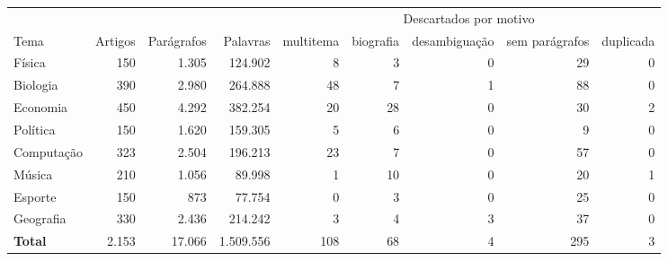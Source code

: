 \footnotesize
\begin{tabular}{lrrrrrrrr}
\toprule
 &  &  &  & \multicolumn{5}{c}{Descartados por motivo} \\
\cmidrule(l){5-9}
Tema & Artigos & Parágrafos & Palavras & multitema & biografia & desambiguação & sem parágrafos & duplicada \\
\midrule
Física & 150 & 1.305 & 124.902 & 8 & 3 & 0 & 29 & 0 \\
Biologia & 390 & 2.980 & 264.888 & 48 & 7 & 1 & 88 & 0 \\
Economia & 450 & 4.292 & 382.254 & 20 & 28 & 0 & 30 & 2 \\
Política & 150 & 1.620 & 159.305 & 5 & 6 & 0 & 9 & 0 \\
Computação & 323 & 2.504 & 196.213 & 23 & 7 & 0 & 57 & 0 \\
Música & 210 & 1.056 & 89.998 & 1 & 10 & 0 & 20 & 1 \\
Esporte & 150 & 873 & 77.754 & 0 & 3 & 0 & 25 & 0 \\
Geografia & 330 & 2.436 & 214.242 & 3 & 4 & 3 & 37 & 0 \\
\midrule
\textbf{Total} & 2.153 & 17.066 & 1.509.556 & 108 & 68 & 4 & 295 & 3 \\
\bottomrule
\end{tabular}
